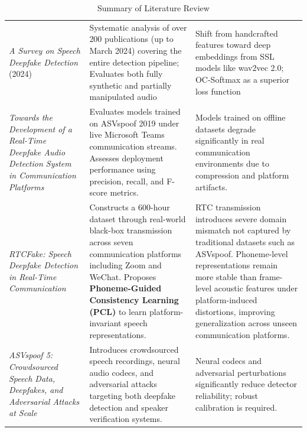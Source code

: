 \begin{longtable}{|
    >{\raggedright\arraybackslash}p{4.3cm} |
    >{\raggedright\arraybackslash}p{4.3cm} |
    >{\raggedright\arraybackslash}p{4.1cm} |}

\caption{Summary of Literature Review}
\label{tab:literature-review} \\
\hline
\multicolumn{1}{|c|}{\parbox[c][2em][c]{4cm}{\centering \textbf{Title}}} &
\multicolumn{1}{c|}{\parbox[c][2em][c]{4.5cm}{\centering \textbf{Methodology}}} &
\multicolumn{1}{c|}{\parbox[c][2em][c]{4.5cm}{\centering \textbf{Key Inferences}}} \\
\hline
\textit{A Survey on Speech Deepfake Detection} (2024) \cite{Li2024_survey} 
& Systematic analysis of over 200 publications (up to March 2024) covering the entire detection pipeline; Evaluates both fully synthetic and partially manipulated audio
& Shift from handcrafted features toward deep embeddings from SSL models like wav2vec 2.0; OC-Softmax as a superior loss function 
\\ \hline
\textit{Towards the Development of a Real-Time Deepfake Audio Detection System in Communication Platforms}
\cite{Mathew2024}
&
Evaluates models trained on ASVspoof 2019 under live Microsoft Teams communication streams. Assesses deployment performance using precision, recall, and F-score metrics.
&
Models trained on offline datasets degrade significantly in real communication environments due to compression and platform artifacts.
\\ \hline
\textit{RTCFake: Speech Deepfake Detection in Real-Time Communication}
\cite{Xue2025_RTCFake}
&
Constructs a 600-hour dataset through real-world black-box transmission across seven communication platforms including Zoom and WeChat. Proposes \textbf{Phoneme-Guided Consistency Learning (PCL)} to learn platform-invariant speech representations.
&
RTC transmission introduces severe domain mismatch not captured by traditional datasets such as ASVspoof. Phoneme-level representations remain more stable than frame-level acoustic features under platform-induced distortions, improving generalization across unseen communication platforms.
\\ \hline
\textit{ASVspoof 5: Crowdsourced Speech Data, Deepfakes, and Adversarial Attacks at Scale}
\cite{Wang2024_asv5}
&
Introduces crowdsourced speech recordings, neural audio codecs, and adversarial attacks targeting both deepfake detection and speaker verification systems.
&
Neural codecs and adversarial perturbations significantly reduce detector reliability; robust calibration is required.

\end{longtable}

